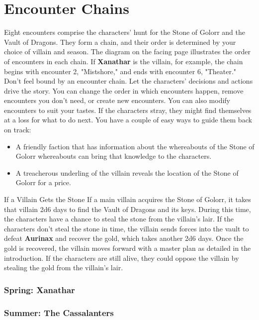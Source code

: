 \documentclass[10pt,a4paper,twoside,twocolumn,openany,nodeprecatedcode]{dndbook}
\begin{document}
\section{Encounter Chains}
Eight encounters comprise the characters' hunt for the Stone of Golorr and the Vault of Dragons. They form a chain, and their order is determined by your choice of villain and season. The diagram on the facing page illustrates the order of encounters in each chain. If \textbf{Xanathar} is the villain, for example, the chain begins with encounter 2, "Mistshore," and ends with encounter 6, "Theater."
Don't feel bound by an encounter chain. Let the characters' decisions and actions drive the story. You can change the order in which encounters happen, remove encounters you don't need, or create new encounters. You can also modify encounters to suit your tastes.
If the characters stray, they might find themselves at a loss for what to do next. You have a couple of easy ways to guide them back on track:
\begin{itemize}

\item A friendly faction that has information about the whereabouts of the Stone of Golorr whereabouts can bring that knowledge to the characters.
\item A treacherous underling of the villain reveals the location of the Stone of Golorr for a price.
\end{itemize}


\begin{DndComment}{If a Villain Gets the Stone}
If a main villain acquires the Stone of Golorr, it takes that villain 2d6 days to find the Vault of Dragons and its keys. During this time, the characters have a chance to steal the stone from the villain's lair. If the characters don't steal the stone in time, the villain sends forces into the vault to defeat \textbf{Aurinax} and recover the gold, which takes another 2d6 days. Once the gold is recovered, the villain moves forward with a master plan as detailed in the introduction. If the characters are still alive, they could oppose the villain by stealing the gold from the villain's lair.
\end{DndComment}

\subsubsection{Spring: Xanathar}
\subsubsection{Summer: The Cassalanters}
\end{document}
